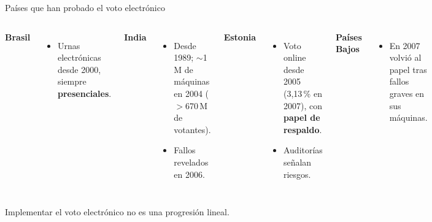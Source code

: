 \documentclass[aspectratio=169,12pt]{beamer}
\begin{document}
\begin{frame}{Países que han probado el voto electrónico}
  \begin{columns}[T]
      {\color{azul}\large\bfseries Brasil}\\[-0.15cm]
      \begin{itemize}
        \item Urnas electrónicas desde 2000, siempre \textbf{presenciales}.
      \end{itemize}
      \vspace{0.1cm}
      {\color{azul}\large\bfseries India}\\[-0.15cm]
      \begin{itemize}
        \item Desde 1989; $\sim$1\,M de máquinas en 2004 ($>$670\,M de votantes).
        \item Fallos revelados en 2006.
      \end{itemize}
      {\color{terra}\large\bfseries Estonia}\\[-0.15cm]
      \begin{itemize}
        \item Voto online desde 2005 (3,13\,\% en 2007), con \textbf{papel de respaldo}.
        \item Auditorías señalan riesgos.
      \end{itemize}
      \vspace{0.1cm}
      {\color{terra}\large\bfseries Países Bajos}\\[-0.15cm]
      \begin{itemize}
        \item En 2007 volvió al papel tras fallos graves en sus máquinas.
      \end{itemize}
  \end{columns}
  \vspace{0.15cm}
  {\large\alert{Implementar el voto electrónico no es una progresión lineal.}}
\end{frame}
\end{document}

